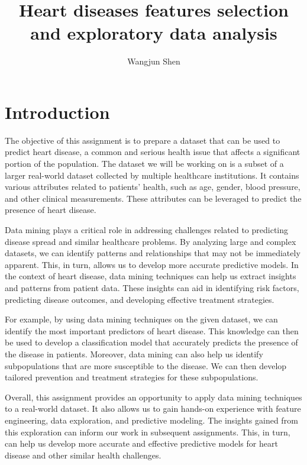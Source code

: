 \documentclass[
]{article}
\title{Heart diseases features selection and exploratory data analysis}
\author{Wangjun Shen}
\date{}
\begin{document}
\maketitle

\hypertarget{introduction}{%
\section{Introduction}\label{introduction}}

The objective of this assignment is to prepare a dataset that can be
used to predict heart disease, a common and serious health issue that
affects a significant portion of the population. The dataset we will be
working on is a subset of a larger real-world dataset collected by
multiple healthcare institutions. It contains various attributes related
to patients' health, such as age, gender, blood pressure, and other
clinical measurements. These attributes can be leveraged to predict the
presence of heart disease.

Data mining plays a critical role in addressing challenges related to
predicting disease spread and similar healthcare problems. By analyzing
large and complex datasets, we can identify patterns and relationships
that may not be immediately apparent. This, in turn, allows us to
develop more accurate predictive models. In the context of heart
disease, data mining techniques can help us extract insights and
patterns from patient data. These insights can aid in identifying risk
factors, predicting disease outcomes, and developing effective treatment
strategies.

For example, by using data mining techniques on the given dataset, we
can identify the most important predictors of heart disease. This
knowledge can then be used to develop a classification model that
accurately predicts the presence of the disease in patients. Moreover,
data mining can also help us identify subpopulations that are more
susceptible to the disease. We can then develop tailored prevention and
treatment strategies for these subpopulations.

Overall, this assignment provides an opportunity to apply data mining
techniques to a real-world dataset. It also allows us to gain hands-on
experience with feature engineering, data exploration, and predictive
modeling. The insights gained from this exploration can inform our work
in subsequent assignments. This, in turn, can help us develop more
accurate and effective predictive models for heart disease and other
similar health challenges.
\end{document}
